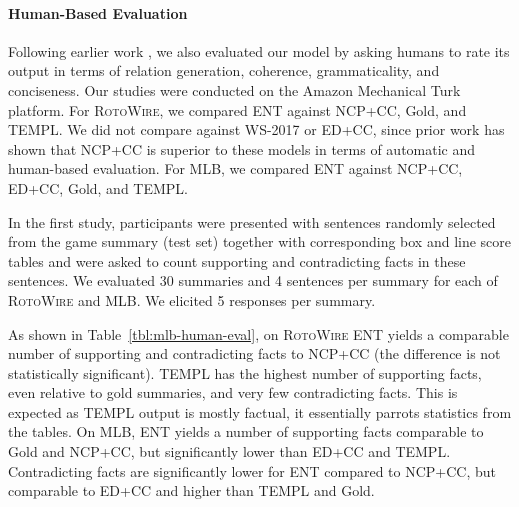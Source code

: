 \documentclass[11pt,a4paper]{article}
\begin{document}
\paragraph{Human-Based Evaluation}
Following earlier work
\cite{D17-1239,DBLP:journals/corr/abs-1809-00582}, we
also evaluated our model by asking humans to rate its output in terms
of relation generation, coherence, grammaticality, and
conciseness. Our studies were conducted on the Amazon Mechanical Turk
platform. For \textsc{RotoWire}, we compared ENT against NCP+CC, Gold,
and TEMPL. We did not compare against WS-2017 or ED+CC, since prior work
\cite{DBLP:journals/corr/abs-1809-00582} has shown that NCP+CC is
superior to these models in terms of automatic and human-based
evaluation. For MLB, we compared ENT against NCP+CC, ED+CC, Gold,
and TEMPL.

In the first study, participants were presented with sentences
randomly selected from the game summary (test set) together with
corresponding box and line score tables and were asked to count
supporting and contradicting facts in these sentences.  We evaluated
30 summaries and 4 sentences per summary for each of \textsc{RotoWire}
and MLB. We elicited 5 responses per summary.


As shown in Table~\ref{tbl:mlb-human-eval}, on \textsc{RotoWire} ENT
yields a comparable number of supporting and contradicting facts to
NCP+CC (the difference is not statistically significant). TEMPL has
the highest number of supporting facts, even relative to gold
summaries, and very few contradicting facts. This is expected as TEMPL
output is mostly factual, it essentially parrots statistics from the
tables. On MLB, ENT yields a number of supporting facts comparable to
Gold and NCP+CC, but significantly lower than ED+CC and TEMPL.
Contradicting facts are significantly lower for ENT compared to
NCP+CC, but comparable to ED+CC and higher than TEMPL and Gold.
\end{document}
